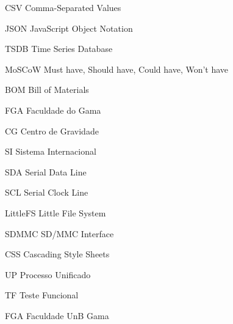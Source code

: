 \begin{siglas}
  \item[CSV] Comma-Separated Values
  \item[JSON] JavaScript Object Notation
  \item[TSDB] Time Series Database
  \item[MoSCoW] Must have, Should have, Could have, Won't have
  \item[BOM] Bill of Materials
  \item[FGA] Faculdade do Gama
  \item[CG] Centro de Gravidade
  \item[SI] Sistema Internacional
  \item[SDA] Serial Data Line
  \item[SCL] Serial Clock Line
  \item[LittleFS] Little File System
  \item[SDMMC] SD/MMC Interface
  \item[CSS] Cascading Style Sheets
  \item[UP] Processo Unificado
  \item[TF] Teste Funcional
  \item[FGA] Faculdade UnB Gama
\end{siglas}